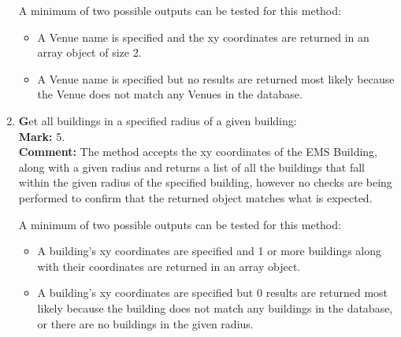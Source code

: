 \documentclass[12pt]{article}
\begin{document}
\begin{enumerate}
		A minimum of two possible outputs can be tested for this method:
		\begin{itemize}
			\item A Venue name is specified and the xy coordinates are returned in an array object of size 2.  
			\item A Venue name is specified but no results are returned most likely because the Venue does not match any Venues in the database.  
		\end{itemize}
		
		\item \textbf Get all buildings in a specified radius of a given building:\\
		\textbf{Mark: }
		5.\\
		\textbf{Comment: }
		The method accepts the xy coordinates of the EMS Building, along with a given radius and returns a list of all the buildings that fall within the given radius of the specified building, however no checks are being performed to confirm that the returned object matches what is expected.
		
		A minimum of two possible outputs can be tested for this method:
		\begin{itemize}
			\item A building's xy coordinates are specified and 1 or more buildings along with their coordinates are returned in an array object.
			\item A building's xy coordinates are specified but 0 results are returned most likely because the building does not match any buildings in the database, or there are no buildings in the given radius.
		\end{itemize}
		
	\end{enumerate}
\end{document}
